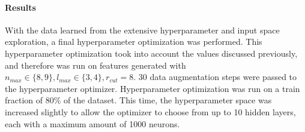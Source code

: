 \paragraph{Results}

With the data learned from the extensive hyperparameter and input space exploration, a final hyperparameter
optimization was performed.
This hyperparameter optimization took into account the values discussed previously, and therefore was run on 
features  generated with $ n_{max} \in \{8,9\}, l_{max} \in \{3,4\}, r_{cut}=8$.
30 data augmentation steps were passed to the hyperparameter optimizer.
Hyperparameter optimization was run on a train fraction of 80\% of the dataset.
This time, the hyperparameter space was increased slightly to allow the optimizer
to choose from up to 10 hidden layers, each with a maximum amount of 1000 neurons.


